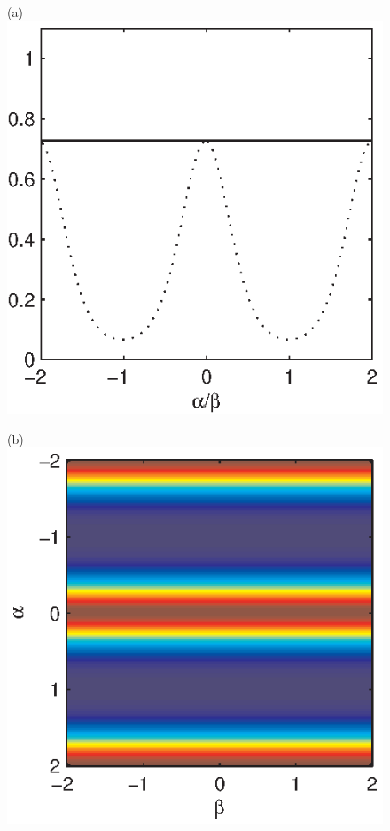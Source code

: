 \documentclass[dvips,aoas,preprint]{imsart}
\numberwithin{equation}{section}
\theoremstyle{plain}
\begin{document}
\begin{figure}[!htbp]
    \begin{minipage}[]{0.32\textwidth}
      \centering
      (a)
      \includegraphics*[width=\textwidth]{pdfen11b.eps}
    \end{minipage}
    \begin{minipage}[]{0.35\textwidth}
      \centering
      (b)
      \includegraphics*[width=\textwidth]{pdfen11.eps}

\end{minipage}
\end{figure}
\end{document}
